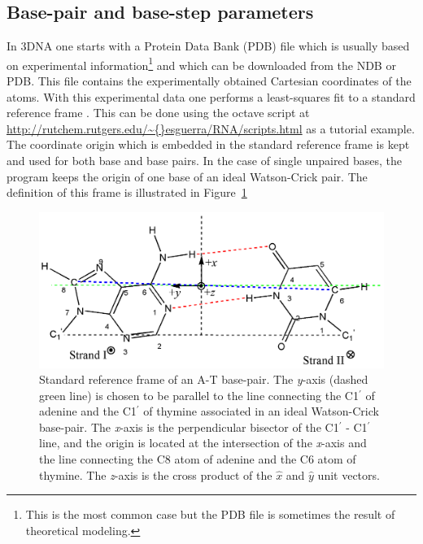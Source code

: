 \subsection{Base-pair and base-step parameters}
In  \textsf{3DNA}   one  starts  with   a  Protein  Data   Bank  (PDB)
\cite{berman2000}  file   which  is  usually   based  on  experimental
information\footnote{This is the most common  case but the PDB file is
  sometimes  the result of  theoretical modeling.}   and which  can be
downloaded from the NDB or  PDB. This file contains the experimentally
obtained Cartesian  coordinates of  the atoms. With  this experimental
data one  performs a least-squares  fit to a standard  reference frame
\cite{olson2001}. This can be done using the \textsf{octave} script at
\url{http://rutchem.rutgers.edu/\~{}esguerra/RNA/scripts.html}   as  a
tutorial  example.  The  coordinate origin  which is  embedded  in the
standard  reference frame  is kept  and used  for both  base  and base
pairs.  In  the case of single  unpaired bases, the  program keeps the
origin of one  base of an ideal Watson-Crick  pair.  The definition of
this frame is illustrated in Figure~\ref{fig:standard}

\begin{figure}[htbp]
\centering
\includegraphics[scale=0.8]{Chapter1/standard.png}
\caption{Standard   reference   frame  of   an   A-T  base-pair.   The
  \textit{y}-axis (dashed green line) is  chosen to be parallel to the
  line connecting the C1$^{'}$ of  adenine and the C1$^{'}$ of thymine
  associated in  an ideal Watson-Crick  base-pair. The \textit{x}-axis
  is the perpendicular  bisector of the C1$^{'}$ -  C1$^{'}$ line, and
  the origin is located at the intersection of the \textit{x}-axis and
  the  line connecting  the C8  atom  of adenine  and the  C6 atom  of
  thymine. The  \textit{z}-axis is the cross product  of the $\hat{x}$
  and $\hat{y}$ unit vectors.}
\label{fig:standard}
\end{figure}

